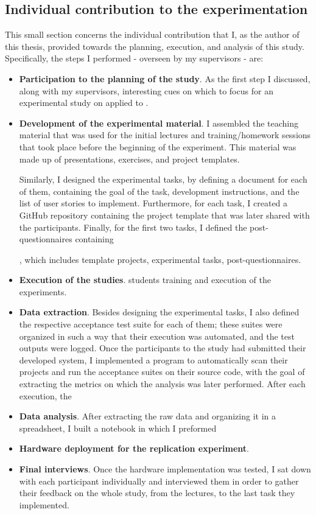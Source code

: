 \subsection{Individual contribution to the experimentation}
This small section concerns the individual contribution that I, as the author of this thesis, provided towards the planning, execution, and analysis of this study.
Specifically, the steps I performed - overseen by my supervisors - are:

\begin{itemize}
    \item \textbf{Participation to the planning of the study}. As the first step I discussed, along with my supervisors, interesting cues on which to focus for an experimental study on \tdd applied to \es.  

    \item \textbf{Development of the experimental material}. I assembled  the teaching material that was used for the initial lectures and training/homework sessions that took place before the beginning of the experiment. This material was made up of presentations, exercises, and project templates.
    
    Similarly, I designed the experimental tasks, by defining a document for each of them, containing the goal of the task, development instructions, and the list of user stories to implement. Furthermore, for each task, I created a GitHub repository containing the project template that was later shared with the participants.
    Finally, for the first two tasks, I defined the post-questionnaires containing 

    , which includes template projects, experimental tasks, post-questionnaires.

    \item \textbf{Execution of the studies}. 
     students training and execution of the experiments.

    \item \textbf{Data extraction}. 
    Besides designing the experimental tasks, I also defined the respective acceptance test suite for each of them; these suites were organized in such a way that their execution was automated, and the test outputs were logged.
    Once the participants to the study had submitted their developed system, I implemented a program to automatically scan their projects and run the acceptance suites on their source code, with the goal of extracting the metrics on which the analysis was later performed. 
    After each execution, the 

    \item\textbf{Data analysis}.
    After extracting the raw data and organizing it in a spreadsheet, I built a notebook in which I preformed 

    \item \textbf{Hardware deployment for the replication experiment}.
    
    \item\textbf{Final interviews}.
    Once the hardware implementation was tested, I sat down with each participant individually and interviewed them in order to gather their feedback on the whole study, from the lectures, to the last task they implemented.
\end{itemize}